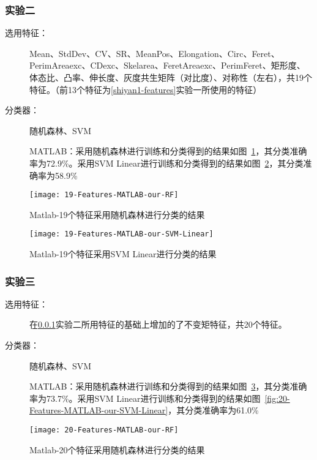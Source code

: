 \subsubsection{实验二}
\label{shiyan2-features}
\begin{description}
\item[选用特征：] Mean、StdDev、CV、SR、MeanPos、Elongation、Circ、Feret、PerimAreaexc、CDexc、Skelarea、FeretAreaexc、PerimFeret、矩形度、体态比、凸率、伸长度、灰度共生矩阵（对比度）、对称性（左右），共19个特征。（前13个特征为\ref{shiyan1-features}实验一所使用的特征）
\item[分类器：] 随机森林、SVM

MATLAB：采用随机森林进行训练和分类得到的结果如图~\ref{fig:19-Features-MATLAB-our-RF}，其分类准确率为72.9\%。采用SVM Linear进行训练和分类得到的结果如图~\ref{fig:19-Features-MATLAB-our-SVM-Linear}，其分类准确率为58.9\%
\end{description}
\begin{figure}[!ht]
\centering
\texttt{[image: 19-Features-MATLAB-our-RF]}
\caption{Matlab-19个特征采用随机森林进行分类的结果}
\label{fig:19-Features-MATLAB-our-RF}
\end{figure}

\begin{figure}[!ht]
\centering
\texttt{[image: 19-Features-MATLAB-our-SVM-Linear]}
\caption{Matlab-19个特征采用SVM Linear进行分类的结果}
\label{fig:19-Features-MATLAB-our-SVM-Linear}
\end{figure}

\subsubsection{实验三}
\label{shiyan3-features}
\begin{description}
\item[选用特征：] 在\ref{shiyan2-features}实验二所用特征的基础上增加的了不变矩特征，共20个特征。
\item[分类器：] 随机森林、SVM

MATLAB：采用随机森林进行训练和分类得到的结果如图~\ref{fig:20-Features-MATLAB-our-RF}，其分类准确率为73.7\%。采用SVM Linear进行训练和分类得到的结果如图~\ref{fig:20-Features-MATLAB-our-SVM-Linear}，其分类准确率为61.0\%
\end{description}
\begin{figure}[!ht]
\centering
\texttt{[image: 20-Features-MATLAB-our-RF]}
\caption{Matlab-20个特征采用随机森林进行分类的结果}
\label{fig:20-Features-MATLAB-our-RF}
\end{figure}

